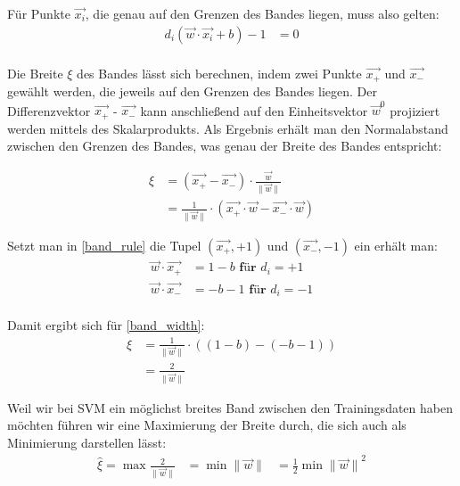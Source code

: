 \documentclass[a4paper,11pt,twoside]{scrreprt}
\begin{document}
Für Punkte $\vec{x_{i}}$, die genau auf den Grenzen des Bandes liegen, muss also gelten:
\begin{equation} \label{band_rule}
    \begin{aligned}
    d_{i} (\vec{w} \cdot \vec{x_{i}} + b) -1 &= 0\\
    \end{aligned}
\end{equation}

Die Breite $\xi$ des Bandes lässt sich berechnen, indem zwei Punkte $\vec{x_{+}}$ und $\vec{x_{-}}$ gewählt werden, die jeweils auf den Grenzen des Bandes liegen. Der Differenzvektor $\vec{x_{+}}$ - $\vec{x_{-}}$ kann anschließend auf den Einheitsvektor $\vec{w}^{0}$ projiziert werden mittels des Skalarprodukts. Als Ergebnis erhält man den Normalabstand zwischen den Grenzen des Bandes, was genau der Breite des Bandes entspricht:

\begin{equation} \label{band_width}
    \begin{aligned}
    \xi &= (\vec{x_{+}} - \vec{x_{-}}) \cdot \frac{\vec{w}}{\lVert \vec{w} \rVert}\\
    &=  \frac{1}{\lVert \vec{w} \rVert} \cdot (\vec{x_{+}} \cdot \vec{w} - \vec{x_{-}} \cdot \vec{w})
    \end{aligned}
\end{equation}

Setzt man in \autoref{band_rule} die Tupel $(\vec{x_{+}}, +1)$ und $(\vec{x_{-}}, -1)$ ein erhält man:
\begin{equation} \label{band_width_x}
    \begin{aligned}
     \vec{w} \cdot \vec{x_{+}} &= 1 -b \textbf{ für $d_{i} = +1$}\\
     \vec{w} \cdot \vec{x_{-}} &= -b -1 \textbf{ für $d_{i} = -1$}\\
    \end{aligned}
\end{equation}

Damit ergibt sich für \autoref{band_width}:
\begin{equation} \label{band_width_final}
    \begin{aligned}
    \xi &= \frac{1}{\lVert \vec{w} \rVert} \cdot ((1-b) - (-b-1)) \\
    &= \frac{2}{\lVert \vec{w} \rVert}
    \end{aligned}
\end{equation}

Weil wir bei \ac{SVM} ein möglichst breites Band zwischen den Trainingsdaten haben möchten führen wir eine Maximierung der Breite durch, die sich auch als Minimierung darstellen lässt:
\begin{equation} \label{band_width_max}
    \begin{aligned}
    \hat{\xi} = \max \frac{2}{\lVert \vec{w} \rVert} &= \min {\lVert \vec{w} \rVert} &= \frac{1}{2} \min {\lVert \vec{w} \rVert}^{2}
    \end{aligned}
\end{equation}
\end{document}
